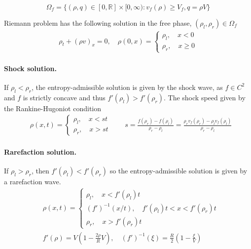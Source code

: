 \documentclass{article}
\numberwithin{equation}{section}
\begin{document}
\begin{equation}
    \Omega_f = \{(\rho, q) \in [0, \mathbb{R}] \times [0, \infty) : v_f(\rho) \geq V_f, q= \rho V \}
    \label{Domain free ph}
\end{equation}

Riemann problem has the following solution in the free phase, $(\rho_l, \rho_r) \in \Omega_f$
\begin{align*}
    \rho_t + (\rho v)_x = 0,\quad  \rho(0,x) = \begin{cases} 
    \rho_l , \quad x < 0 \\
    \rho_r, \quad x \geq 0 
    \end{cases}
\end{align*}

\paragraph{Shock solution.} If $\rho_l < \rho_r$, the entropy-admissible solution is given by the shock wave, as $f \in C^2$ and $f$ is strictly concave and thus $f'(\rho_l) > f'(\rho_r) $. The shock speed given by the Rankine-Hugoniot condition
\begin{align*}
    & \rho(x,t) = \begin{cases}
    \rho_l, \quad x < s t \\
    \rho_r, \quad x > s t
    \end{cases} 
    \quad \quad s = \frac{f(\rho_r) - f(\rho_l)}{\rho_r - \rho_l} = \frac{\rho_r v_f(\rho_r) -\rho_l v_f(\rho_l)}{\rho_r - \rho_l}
\end{align*}

\paragraph{Rarefaction solution.} If $\rho_l > \rho_r$, then $f'(\rho_l) < f'(\rho_r) $ so the entropy-admissible solution is given by a rarefaction wave.
\begin{align*}
    & \rho(x,t) = \begin{cases}
    \rho_l, \quad x < f'(\rho_l)t \\
    (f')^{-1}(x/t),  \quad  f'(\rho_l)t < x < f'(\rho_r)t \\
     \rho_r, \quad x > f'(\rho_r)t
    \end{cases} \\
    & f'(\rho) = V(1-\frac{2 \rho}{R}V) , \quad  (f')^{-1}(\xi) = \frac{R}{2}(1-\frac{\xi}{V}) 
\end{align*}
\end{document}
